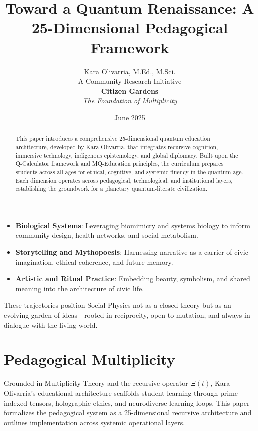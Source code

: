 \documentclass{article}
\theoremstyle{plain}
\theoremstyle{claimstyle}
\begin{document}
\begin{itemize}
    \item \textbf{Biological Systems}: Leveraging biomimicry and systems biology to inform community design, health networks, and social metabolism.
    \item \textbf{Storytelling and Mythopoesis}: Harnessing narrative as a carrier of civic imagination, ethical coherence, and future memory.
    \item \textbf{Artistic and Ritual Practice}: Embedding beauty, symbolism, and shared meaning into the architecture of civic life.
\end{itemize}

These trajectories position Social Physics not as a closed theory but as an evolving garden of ideas—rooted in reciprocity, open to mutation, and always in dialogue with the living world.

\newpage
\title{\textbf{Toward a Quantum Renaissance: A 25-Dimensional Pedagogical Framework}}
\author{Kara Olivarria, M.Ed., M.Sci.\\ A Community Research Initiative \\ \textbf{ Citizen Gardens} \\ \textit {The Foundation of Multiplicity}}
\date{June 2025}

\maketitle

\begin{abstract}
This paper introduces a comprehensive 25-dimensional quantum education architecture, developed by Kara Olivarria, that integrates recursive cognition, immersive technology, indigenous epistemology, and global diplomacy. Built upon the Q-Calculator framework and MQ-Education principles, the curriculum prepares students across all ages for ethical, cognitive, and systemic fluency in the quantum age. Each dimension operates across pedagogical, technological, and institutional layers, establishing the groundwork for a planetary quantum-literate civilization.
\end{abstract}

\section{Pedagogical Multiplicity}
Grounded in Multiplicity Theory and the recursive operator \(\Xi(t)\), Kara Olivarria's educational architecture scaffolds student learning through prime-indexed tensors, holographic ethics, and neurodiverse learning loops. This paper formalizes the pedagogical system as a 25-dimensional recursive architecture and outlines implementation across systemic operational layers.
\end{document}
